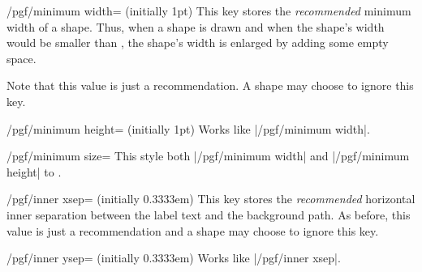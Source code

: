 \begin{key}{/pgf/minimum width= (initially 1pt)}
    This key stores the \emph{recommended} minimum width of a shape. Thus, when
    a shape is drawn and when the shape's width would be smaller than
    , the shape's width is enlarged by adding some empty space.

    Note that this value is just a recommendation. A shape may choose to ignore
    this key.
\begin{codeexample}[]
\end{codeexample}
\end{key}

\begin{key}{/pgf/minimum height= (initially 1pt)}
    Works like |/pgf/minimum width|.
\end{key}

\begin{key}{/pgf/minimum size=}
    This style both |/pgf/minimum width| and |/pgf/minimum height| to .
\end{key}

\begin{key}{/pgf/inner xsep= (initially 0.3333em)}
    This key stores the \emph{recommended} horizontal inner separation between
    the label text and the background path. As before, this value is just a
    recommendation and a shape may choose to ignore this key.
\begin{codeexample}[]
\end{codeexample}
\end{key}

\begin{key}{/pgf/inner ysep= (initially 0.3333em)}
    Works like |/pgf/inner xsep|.
\end{key}

